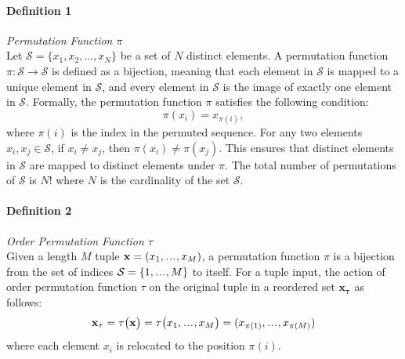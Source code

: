 \documentclass{article}
\newcommand\sdots{\makebox[1em][c]{.\hfil.\hfil.}}
\begin{document}
\paragraph{Definition 1} \emph{Permutation Function $\pi$}\\
Let $\mathcal{S} = \{x_1, x_2, \ldots, x_N\}$ be a set of $N$ distinct elements. A permutation function $\pi: \mathcal{S} \rightarrow \mathcal{S}$ is defined as a bijection, meaning that each element in $\mathcal{S}$ is mapped to a unique element in $\mathcal{S}$, and every element in $\mathcal{S}$ is the image of exactly one element in $\mathcal{S}$. Formally, the permutation function $\pi$ satisfies the following condition:
\[ \pi(x_i) = x_{\pi(i)}, \]
where $\pi(i)$ is the index in the permuted sequence. For any two elements $x_i, x_j \in \mathcal{S}$, if $x_i \neq x_j$, then $\pi(x_i) \neq \pi(x_j)$. This ensures that distinct elements in $\mathcal{S}$ are mapped to distinct elements under $\pi$.
The total number of permutations of $\mathcal{S}$ is $N!$ where $N$ is the cardinality of the set $\mathcal{S}$.


\paragraph{Definition 2} \emph{Order Permutation Function $\tau$}\\
Given a length $M$ tuple $\mathbf{x} = (x_1, \sdots, x_M) $, a permutation function \(\pi\) is a bijection from the set of indices $\mathcal{S}=\{1, \sdots, M\}$ to itself.
For a tuple input, the action of order permutation function \(\tau\) on the original tuple in a reordered set $\mathbf{x_{\tau}}$  as follows:
\begin{align}
 \mathbf{x}_{\tau} = \tau\big(\mathbf{x} \big) = \tau\big( x_{1}, \sdots, x_{M} \big) = (x_{\pi(1)}, \sdots, x_{\pi(M)} )
\end{align}
where each element \( x_i \) is relocated to the position \( \pi(i) \).
\end{document}

